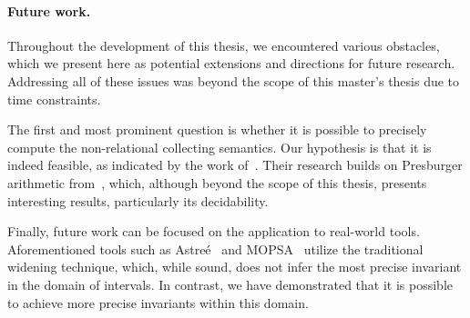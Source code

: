 \paragraph*{Future work.}
Throughout the development of this thesis, we encountered various
obstacles, which we present here as potential extensions and
directions for future research. Addressing all of these issues was
beyond the scope of this master's thesis due to time constraints.

The first and most prominent question is whether it is possible to
precisely compute the non-relational collecting semantics. Our
hypothesis is that it is indeed feasible, as indicated by the work
of~\cite{Lefaucheux2024}. Their research builds on Presburger
arithmetic from~\cite{1571698599431503232}, which, although beyond the
scope of this thesis, presents interesting results, particularly its
decidability.

Finally, future work can be focused on the application to real-world
tools. Aforementioned tools such as
Astreé~\cite{10.1007/978-3-540-31987-0_3} and
MOPSA~\cite{10.1007/978-3-031-30820-8_37} utilize the traditional
widening technique, which, while sound, does not infer the most
precise invariant in the domain of intervals. In contrast, we have
demonstrated that it is possible to achieve more precise invariants
within this domain.
